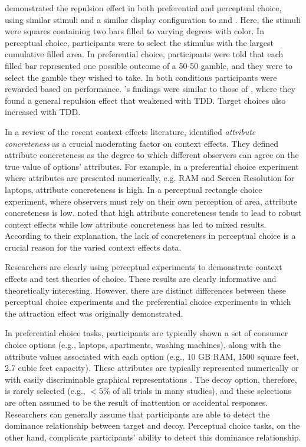 \textcite{spektorRepulsionEffectPreferential2022} demonstrated the repulsion effect in both preferential and perceptual choice, using similar stimuli and a similar display configuration to \textcite{spektorWhenGoodLooks2018b} and \textcite{liaoInfluenceDistanceDecoy2021}. Here, the stimuli were squares containing two bars filled to varying degrees with color. In perceptual choice, participants were to select the stimulus with the largest cumulative filled area. In preferential choice, participants were told that each filled bar represented one possible outcome of a 50-50 gamble, and they were to select the gamble they wished to take. In both conditions participants were rewarded based on performance. \textcite{spektorRepulsionEffectPreferential2022}'s findings were similar to those of \textcite{spektorWhenGoodLooks2018b}, where they found a general repulsion effect that weakened with TDD. Target choices also increased with TDD.

In a review of the recent context effects literature, \textcite{spektorElusivenessContextEffects2021} identified \textit{attribute concreteness} as a crucial moderating factor on context effects. They defined attribute concreteness as the degree to which different observers can agree on the true value of options' attributes. For example, in a preferential choice experiment where attributes are presented numerically, e.g. RAM and Screen Resolution for laptops, attribute concreteness is high. In a perceptual rectangle choice experiment, where observers must rely on their own perception of area, attribute concreteness is low. \textcite{spektorElusivenessContextEffects2021} noted that high attribute concreteness tends to lead to robust context effects while low attribute concreteness has led to mixed results. According to their explanation, the lack of concreteness in perceptual choice is a crucial reason for the varied context effects data. 

Researchers are clearly using perceptual experiments to demonstrate context effects and test theories of choice. These results are clearly informative and theoretically interesting. However, there are distinct differences between these perceptual choice experiments and the preferential choice experiments in which the attraction effect was originally demonstrated. 

In preferential choice tasks, participants are typically shown a set of consumer choice options (e.g., laptops, apartments, washing machines), along with the attribute values associated with each option (e.g., 10 GB RAM, 1500 square feet, 2.7 cubic feet capacity). These attributes are typically represented numerically \parencite{hayes2024attribute,banerjeeFactorsThatPromote2024} or with easily discriminable graphical representations \parencite{cataldoComparisonProcessAccount2019b}. The decoy option, therefore, is rarely selected (e.g., $<5\%$ of all trials in many studies), and these selections are often assumed to be the result of inattention or accidental responses. Researchers can generally assume that participants are able to detect the dominance relationship between target and decoy. Perceptual choice tasks, on the other hand, complicate participants' ability to detect this dominance relationship.

